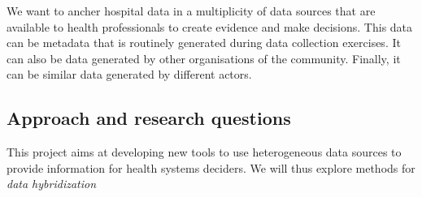 We want to ancher hospital data in a multiplicity of data sources that are available to health professionals to create evidence and make decisions. This data can be metadata that is routinely generated during data collection exercises. It can also be data generated by other organisations of the community. Finally, it can be similar data generated by different actors.

\subsection{Approach and research questions}


This project aims at developing new tools to use heterogeneous data sources to provide information for health systems deciders. We will thus explore methods for \textit{data hybridization}

